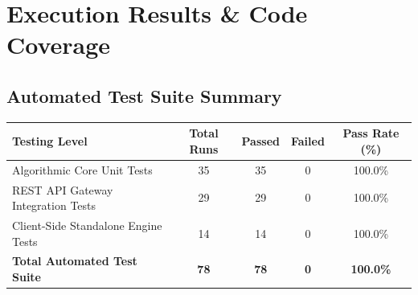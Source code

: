 \documentclass[12pt,a4paper]{report}
\begin{document}
\newpage

\chapter{Execution Results \& Code Coverage}

\section{Automated Test Suite Summary}
\begin{table}[ht]
\centering
\begin{tabularx}{\textwidth}{X c c c c}
\toprule
\textbf{Testing Level} & \textbf{Total Runs} & \textbf{Passed} & \textbf{Failed} & \textbf{Pass Rate (\%)} \\
\midrule
Algorithmic Core Unit Tests & 35 & 35 & 0 & 100.0\% \\
REST API Gateway Integration Tests & 29 & 29 & 0 & 100.0\% \\
Client-Side Standalone Engine Tests & 14 & 14 & 0 & 100.0\% \\
\textbf{Total Automated Test Suite} & \textbf{78} & \textbf{78} & \textbf{0} & \textbf{100.0\%} \\
\bottomrule
\end{tabularx}
\end{table}
\end{document}
